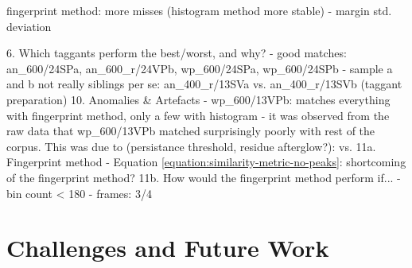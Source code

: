 \documentclass[thesis.tex]{subfiles}
\begin{document}
fingerprint method: more misses (histogram method more stable)
- margin std. deviation

6. Which taggants perform the best/worst, and why?
  - good matches: an\_600/24SPa, an\_600\_r/24VPb, wp\_600/24SPa, wp\_600/24SPb
  - sample a and b not really siblings per se: an\_400\_r/13SVa vs. an\_400\_r/13SVb (taggant preparation)
10. Anomalies \& Artefacts
  - wp\_600/13VPb: matches everything with fingerprint method, only a few with histogram
  - it was observed from the raw data that wp\_600/13VPb matched surprisingly poorly with rest of the corpus. This was due to (persistance threshold, residue afterglow?):
    vs.
11a. Fingerprint method
  - Equation \ref{equation:similarity-metric-no-peaks}: shortcoming of the fingerprint method?
11b. How would the fingerprint method perform if...
  - bin count < 180
  - frames: 3/4

\section{Challenges and Future Work}

\end{document}
